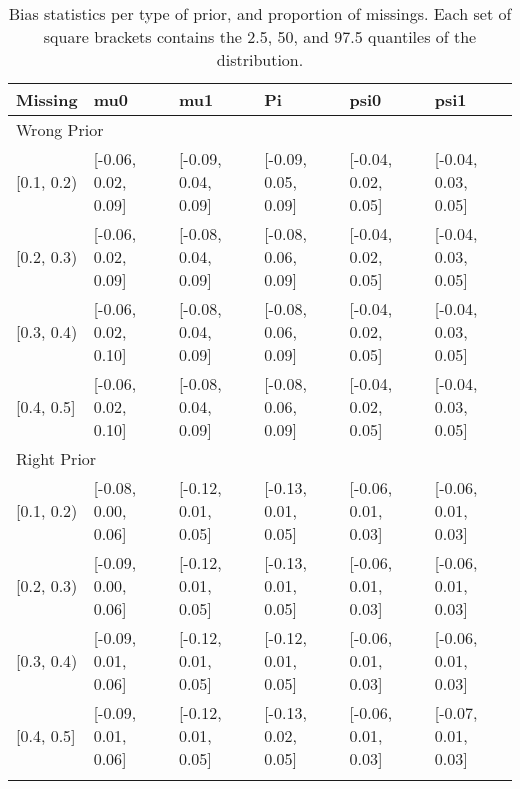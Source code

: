 \begin{table}[ht]
\centering
\begin{tabular}{llllll}
  \toprule
Missing & mu0 & mu1 & Pi & psi0 & psi1 \\ 
  \midrule
\multicolumn{6}{l}{Wrong Prior}\\
{[0.1, 0.2)} & {[-0.06, 0.02, 0.09]} & {[-0.09, 0.04, 0.09]} & {[-0.09, 0.05, 0.09]} & {[-0.04, 0.02, 0.05]} & {[-0.04, 0.03, 0.05]} \\ 
  {[0.2, 0.3)} & {[-0.06, 0.02, 0.09]} & {[-0.08, 0.04, 0.09]} & {[-0.08, 0.06, 0.09]} & {[-0.04, 0.02, 0.05]} & {[-0.04, 0.03, 0.05]} \\ 
  {[0.3, 0.4)} & {[-0.06, 0.02, 0.10]} & {[-0.08, 0.04, 0.09]} & {[-0.08, 0.06, 0.09]} & {[-0.04, 0.02, 0.05]} & {[-0.04, 0.03, 0.05]} \\ 
  {[0.4, 0.5]} & {[-0.06, 0.02, 0.10]} & {[-0.08, 0.04, 0.09]} & {[-0.08, 0.06, 0.09]} & {[-0.04, 0.02, 0.05]} & {[-0.04, 0.03, 0.05]} \\ 
   \midrule
\multicolumn{6}{l}{Right Prior}\\
{[0.1, 0.2)} & {[-0.08, 0.00, 0.06]} & {[-0.12, 0.01, 0.05]} & {[-0.13, 0.01, 0.05]} & {[-0.06, 0.01, 0.03]} & {[-0.06, 0.01, 0.03]} \\ 
  {[0.2, 0.3)} & {[-0.09, 0.00, 0.06]} & {[-0.12, 0.01, 0.05]} & {[-0.13, 0.01, 0.05]} & {[-0.06, 0.01, 0.03]} & {[-0.06, 0.01, 0.03]} \\ 
  {[0.3, 0.4)} & {[-0.09, 0.01, 0.06]} & {[-0.12, 0.01, 0.05]} & {[-0.12, 0.01, 0.05]} & {[-0.06, 0.01, 0.03]} & {[-0.06, 0.01, 0.03]} \\ 
  {[0.4, 0.5]} & {[-0.09, 0.01, 0.06]} & {[-0.12, 0.01, 0.05]} & {[-0.13, 0.02, 0.05]} & {[-0.06, 0.01, 0.03]} & {[-0.07, 0.01, 0.03]} \\ 
   \bottomrule
\multicolumn{6}{l}{}\\
\end{tabular}
\caption{Bias statistics per type of prior, and proportion of missings. Each set of square brackets contains the 2.5, 50, and 97.5 quantiles of the distribution.} 
\label{tab:bias-prior-missigness}
\end{table}
